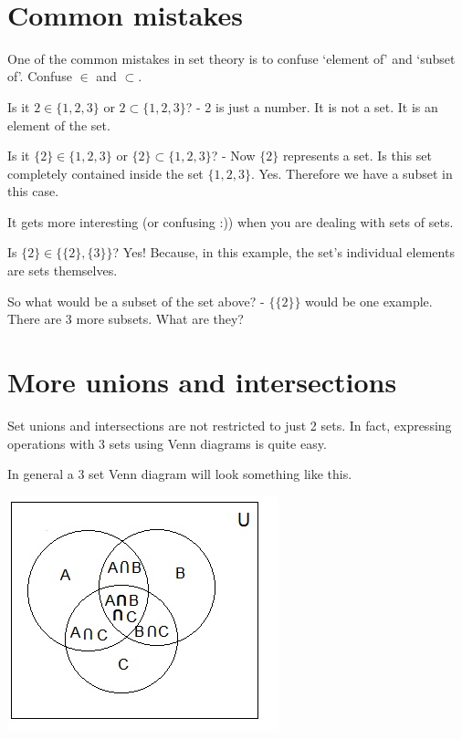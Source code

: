 \documentclass[12pt]{article}
\begin{document}
\begin{center}
\\
\vspace{1cm}
\end{center}


\medskip\noindent
	

\vspace{0.5cm}\noindent

\section*{Common mistakes}

One of the common mistakes in set theory is to confuse `element of' and `subset of'. Confuse $\in$ and $\subset$.

Is it $2 \in \{1,2,3\}$ or $2 \subset \{1,2,3\}$? - 2 is just a number. It is not a set. It is an element of the set.

Is it $\{2\} \in \{1,2,3\}$ or $\{2\} \subset \{1,2,3\}$? - Now $\{2\}$ represents a set. Is this set completely contained inside the set $\{1,2,3\}$. Yes. Therefore we have a subset in this case.

It gets more interesting (or confusing :)) when you are dealing with sets of sets.

Is $\{2\} \in \{\{2\},\{3\}\}$? Yes! Because, in this example, the set's individual elements are sets themselves.

So what would be a subset of the set above? - $\{\{2\}\}$ would be one example. There are 3 more subsets. What are they?

\section*{More unions and intersections}

Set unions and intersections are not restricted to just 2 sets. In fact, expressing operations with 3 sets using Venn diagrams is quite easy.

In general a 3 set Venn diagram will look something like this.

\includegraphics{./img/3setsVenn.png}
\end{document}
